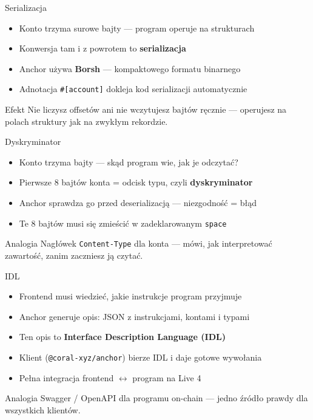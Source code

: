 \begin{frame}{Serializacja}
  \begin{itemize}
    \item Konto trzyma surowe bajty --- program operuje na strukturach
    \item Konwersja tam i z powrotem to \textbf{serializacja}
    \item Anchor używa \textbf{Borsh} --- kompaktowego formatu binarnego
    \item Adnotacja \texttt{\#[account]} dokleja kod serializacji automatycznie
  \end{itemize}
  \vspace{0.25cm}
  \begin{exampleblock}{Efekt}
    Nie liczysz offsetów ani nie wczytujesz bajtów ręcznie ---
    operujesz na polach struktury jak na zwykłym rekordzie.
  \end{exampleblock}
\end{frame}

\begin{frame}{Dyskryminator}
  \begin{itemize}
    \item Konto trzyma bajty --- skąd program wie, jak je odczytać?
    \item Pierwsze 8 bajtów konta = odcisk typu, czyli \textbf{dyskryminator}
    \item Anchor sprawdza go przed deserializacją --- niezgodność = błąd
    \item Te 8 bajtów musi się zmieścić w zadeklarowanym \texttt{space}
  \end{itemize}
  \vspace{0.25cm}
  \begin{block}{Analogia}
    Nagłówek \texttt{Content-Type} dla konta --- mówi, jak interpretować zawartość,
    zanim zaczniesz ją czytać.
  \end{block}
\end{frame}

\begin{frame}{IDL}
  \begin{itemize}
    \item Frontend musi wiedzieć, jakie instrukcje program przyjmuje
    \item Anchor generuje opis: JSON z instrukcjami, kontami i typami
    \item Ten opis to \textbf{Interface Description Language (IDL)}
    \item Klient (\texttt{@coral-xyz/anchor}) bierze IDL i daje gotowe wywołania
    \item Pełna integracja frontend $\leftrightarrow$ program na Live 4
  \end{itemize}
  \vspace{0.25cm}
  \begin{exampleblock}{Analogia}
    Swagger / OpenAPI dla programu on-chain --- jedno źródło prawdy
    dla wszystkich klientów.
  \end{exampleblock}
\end{frame}

